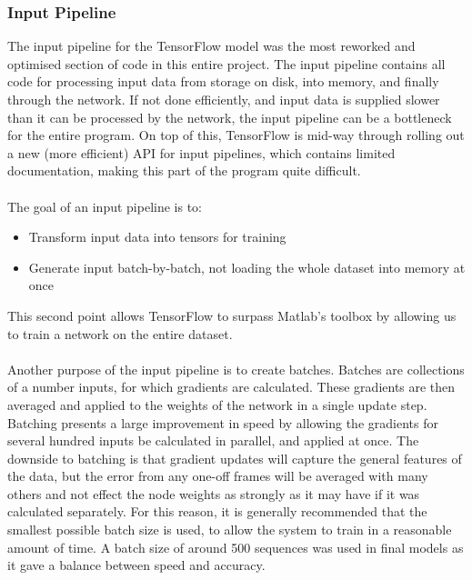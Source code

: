 \documentclass[a4paper,11pt,notitlepage]{article}
\begin{document}
\subsubsection{Input Pipeline}\label{section:input_pipeline}

The input pipeline for the TensorFlow model was the most reworked and optimised section of code in this entire project. The input pipeline contains all code for processing input data from storage on disk, into memory, and finally through the network. If not done efficiently, and input data is supplied slower than it can be processed by the network, the input pipeline can be a bottleneck for the entire program. On top of this, TensorFlow is mid-way through rolling out a new (more efficient) API for input pipelines, which contains limited documentation, making this part of the program quite difficult.\\
\\
The goal of an input pipeline is to:
\begin{itemize}
\item Transform input data into tensors for training
\item Generate input batch-by-batch, not loading the whole dataset into memory at once
\end{itemize}
This second point allows TensorFlow to surpass Matlab's toolbox by allowing us to train a network on the entire dataset.\\
\\
Another purpose of the input pipeline is to create batches. Batches are collections of a number inputs, for which gradients are calculated. These gradients are then averaged and applied to the weights of the network in a single update step. Batching presents a large improvement in speed by allowing the gradients for several hundred inputs be calculated in parallel, and applied at once. The downside to batching is that gradient updates will capture the general features of the data, but the error from any one-off frames will be averaged with many others and not effect the node weights as strongly as it may have if it was calculated separately. For this reason, it is generally recommended that the smallest possible batch size is used, to allow the system to train in a reasonable amount of time. A batch size of around 500 sequences was used in final models as it gave a balance between speed and accuracy.\\
\end{document}
